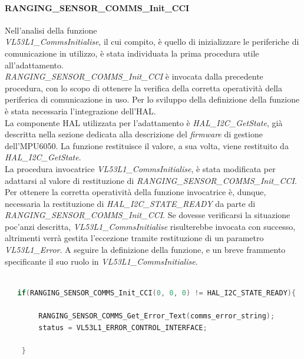 \paragraph{RANGING\_SENSOR\_COMMS\_Init\_CCI}
Nell'analisi della funzione\\\textit{VL53L1\_CommsInitialise}, il cui compito, è quello di inizializzare le periferiche di comunicazione in utilizzo, è stata individuata la prima procedura utile all'adattamento.\\
\textit{RANGING\_SENSOR\_COMMS\_Init\_CCI} è invocata dalla precedente procedura, con lo scopo di ottenere la verifica della corretta operatività della periferica di comunicazione in uso.
Per lo sviluppo della definizione della funzione è stata necessaria l'integrazione dell'HAL.\\
La componente HAL utilizzata per l'adattamento è \textit{HAL\_I2C\_GetState}, già descritta nella sezione dedicata alla descrizione del \textit{firmware} di gestione dell'MPU6050.
La funzione restituisce il valore, a sua volta, viene restituito da \textit{HAL\_I2C\_GetState}.\\
La procedura invocatrice \textit{VL53L1\_CommsInitialise}, è stata modificata per adattarsi al valore di restituzione di \textit{RANGING\_SENSOR\_COMMS\_Init\_CCI}.\\
Per ottenere la corretta operatività della funzione invocatrice è, dunque, necessaria la restituzione di \textit{HAL\_I2C\_STATE\_READY} da parte di \textit{RANGING\_SENSOR\_COMMS\_Init\_CCI}.
Se dovesse verificarsi la situazione poc'anzi descritta, \textit{VL53L1\_CommsInitialise} risulterebbe invocata con successo, altrimenti verrà gestita l'eccezione tramite restituzione di un parametro \textit{VL53L1\_Error}.
A seguire la definizione della funzione, e un breve frammento specificante il suo ruolo in \textit{VL53L1\_CommsInitialise}.


\begin{lstlisting}[language=Cpp, caption={Dettaglio dell'implementazione di textit{RANGING\_SENSOR\_COMMS\_Init\_CCI} in \textit{VL53L1\_CommsInitialise}}]
    
   if(RANGING_SENSOR_COMMS_Init_CCI(0, 0, 0) != HAL_I2C_STATE_READY){

        RANGING_SENSOR_COMMS_Get_Error_Text(comms_error_string);
        status = VL53L1_ERROR_CONTROL_INTERFACE;

    }
\end{lstlisting}

